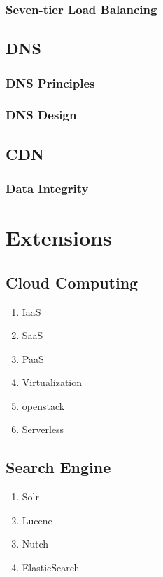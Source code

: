 \documentclass[11pt, twocolumn]{article}
\begin{document}
\subsubsection{Seven-tier Load Balancing}

\subsection{DNS}

\subsubsection{DNS Principles}

\subsubsection{DNS Design}

\subsection{CDN}

\subsubsection{Data Integrity}

\section{Extensions}

\subsection{Cloud Computing}
\begin{enumerate}
	\item IaaS
	\item SaaS
	\item PaaS
	\item Virtualization
	\item openstack
	\item Serverless
\end{enumerate}

\subsection{Search Engine}
\begin{enumerate}
	\item Solr
	\item Lucene
	\item Nutch
	\item ElasticSearch
\end{enumerate}
\end{document}
